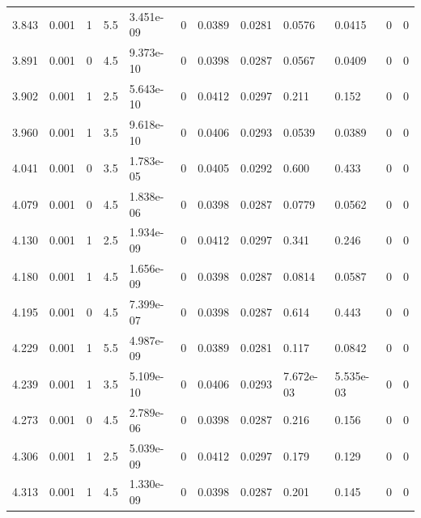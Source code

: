 \documentclass[preview]{standalone}
\begin{document}
{{{\begin{tabular}{L{1.2cm}C{1.2cm} C{0.3cm}C{0.5cm} C{1.4cm}C{1.4cm} C{1.4cm}C{1.4cm} C{1.6cm}C{1.6cm} C{1.6cm}C{1.6cm}}
  3.843  &  0.001  & 1     & 5.5 &  3.451e-09  & 0  &  0.0389&   0.0281& 0.0576 & 0.0415   &  0 & 0  \\ 
  3.891  &  0.001  & 0     & 4.5 &  9.373e-10  & 0  &  0.0398&   0.0287& 0.0567 & 0.0409   &  0 & 0  \\ 
  3.902  &  0.001  & 1     & 2.5 &  5.643e-10  & 0  &  0.0412&   0.0297& 0.211 & 0.152   &  0 & 0  \\ 
  3.960  &  0.001  & 1     & 3.5 &  9.618e-10  & 0  &  0.0406&   0.0293& 0.0539 & 0.0389   &  0 & 0  \\ 
  4.041  &  0.001  & 0     & 3.5 &  1.783e-05  & 0  &  0.0405&   0.0292& 0.600 & 0.433   &  0 & 0  \\ 
  4.079  &  0.001  & 0     & 4.5 &  1.838e-06  & 0  &  0.0398&   0.0287& 0.0779 & 0.0562   &  0 & 0  \\ 
  4.130  &  0.001  & 1     & 2.5 &  1.934e-09  & 0  &  0.0412&   0.0297& 0.341 & 0.246   &  0 & 0  \\ 
  4.180  &  0.001  & 1     & 4.5 &  1.656e-09  & 0  &  0.0398&   0.0287& 0.0814 & 0.0587   &  0 & 0  \\ 
  4.195  &  0.001  & 0     & 4.5 &  7.399e-07  & 0  &  0.0398&   0.0287& 0.614 & 0.443   &  0 & 0  \\ 
  4.229  &  0.001  & 1     & 5.5 &  4.987e-09  & 0  &  0.0389&   0.0281& 0.117 & 0.0842   &  0 & 0  \\ 
  4.239  &  0.001  & 1     & 3.5 &  5.109e-10  & 0  &  0.0406&   0.0293& 7.672e-03 & 5.535e-03   &  0 & 0  \\ 
  4.273  &  0.001  & 0     & 4.5 &  2.789e-06  & 0  &  0.0398&   0.0287& 0.216 & 0.156   &  0 & 0  \\ 
  4.306  &  0.001  & 1     & 2.5 &  5.039e-09  & 0  &  0.0412&   0.0297& 0.179 & 0.129   &  0 & 0  \\ 
  4.313  &  0.001  & 1     & 4.5 &  1.330e-09  & 0  &  0.0398&   0.0287& 0.201 & 0.145   &  0 & 0  \\ 
\hline 
\end{tabular} 

}}}
\end{document}
